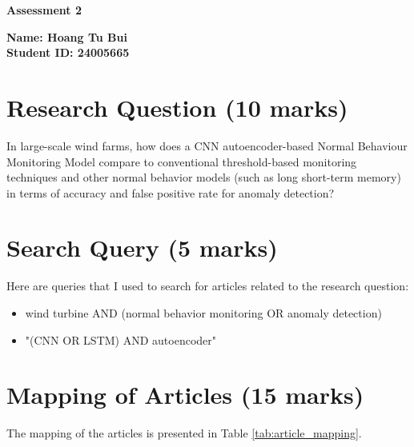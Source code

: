 \documentclass[a4paper,12pt]{article}
\begin{document}
\begin{center}
    \textbf{\Large Assessment 2} \vspace{0.5cm}
\end{center}

\textbf{Name: Hoang Tu Bui} \\
\textbf{Student ID: 24005665} 

\section{ Research Question (10 marks)}
In large-scale wind farms, how does a CNN autoencoder-based Normal Behaviour Monitoring Model compare to conventional threshold-based monitoring techniques and other normal behavior models (such as long short-term memory) in terms of accuracy and false positive rate for anomaly detection?

\section{Search Query (5 marks)}
Here are queries that I used to search for articles related to the research question:
\begin{itemize}
    \item wind turbine AND (normal behavior monitoring OR anomaly detection)
    \item "(CNN OR LSTM) AND autoencoder"
\end{itemize}

\section{Mapping of Articles (15 marks)}

The mapping of the articles is presented in Table \ref{tab:article_mapping}.
\end{document}
